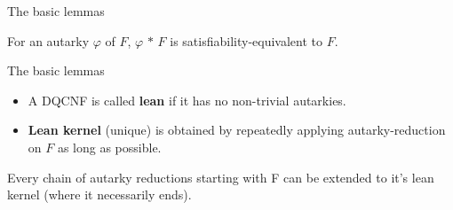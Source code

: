 \documentclass[xcolor=table	]{beamer}
\begin{document}
\begin{frame}{The basic lemmas}
 \begin{lemma}
  For an autarky $\varphi$ of $F$, $\varphi$ $\ast$ $F$ is satisfiability-equivalent to $F$.
 \end{lemma}
{}
\end{frame}

\begin{frame}{The basic lemmas}
 \begin{itemize}
 \item A DQCNF is called \textbf{lean} if it has no non-trivial autarkies. \newline
 	\pause 
 	
 \item	\textbf{Lean kernel} (unique) is obtained by repeatedly applying autarky-reduction on $F$ as long as possible. \newline
 \end{itemize}
  
 \pause 
  \begin{lemma}
 	Every chain of autarky reductions starting
 	with F can be extended \newline to it's lean kernel (where
 	it necessarily ends).
 \end{lemma}
\vspace{0.5cm}
 
\end{frame}
\end{document}
